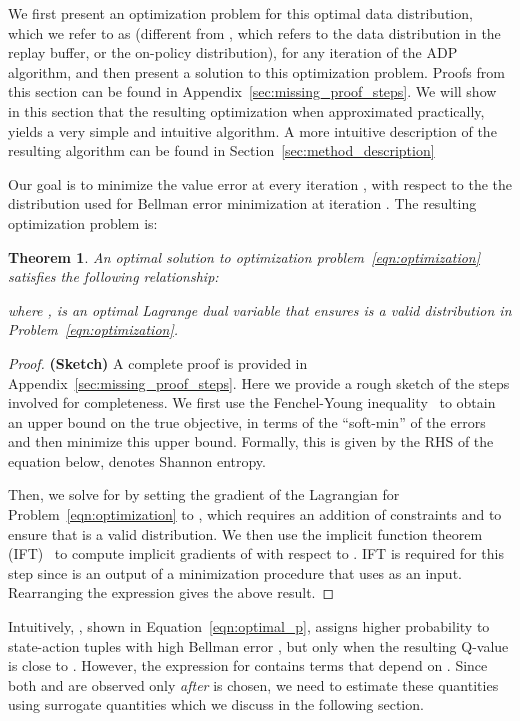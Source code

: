 \documentclass[jmlr]{article}
\newtheorem{theorem}{Theorem}[section]
\begin{document}
We first present an optimization problem for this optimal data distribution, which we refer to as  (different from , which refers to the data distribution in the replay buffer, or the on-policy distribution), for any iteration  of the ADP algorithm, and then present a solution to this optimization problem. 
Proofs from this section can be found in Appendix~\ref{sec:missing_proof_steps}. We will show in this section that the resulting optimization when approximated practically, yields a very simple and intuitive algorithm. A more intuitive description of the resulting algorithm can be found in Section~\ref{sec:method_description}




Our goal is to minimize the value error  at every iteration , with respect to the the distribution  used for Bellman error minimization at iteration . 
The resulting optimization problem is:

\begin{theorem}
\label{eqn:theorem_solution}
An optimal solution  to optimization problem~\ref{eqn:optimization} satisfies the following relationship:

where , is an optimal Lagrange dual variable that ensures  is a valid distribution in Problem~\ref{eqn:optimization}. 
\end{theorem}
\begin{proof}
\textbf{(Sketch)} A complete proof is provided in Appendix~\ref{sec:missing_proof_steps}. Here we provide a rough sketch of the steps involved for completeness. We first use the Fenchel-Young inequality~\cite{rockafellar-1970a} to obtain an upper bound on the true objective, in terms of the ``soft-min'' of the errors  and then minimize this upper bound. Formally, this is given by the RHS of the equation below,  denotes Shannon entropy.

Then, we solve for  by setting the gradient of the Lagrangian for Problem~\ref{eqn:optimization} to , which requires an addition of constraints  and  to ensure that  is a valid distribution. We then use the implicit function theorem (IFT)~\citep{Krantz2002TheIF} to compute implicit gradients of  with respect to . IFT is required for this step since  is an output of a minimization procedure that uses  as an input. Rearranging the expression gives the above result.    
\end{proof}

Intuitively, , shown in Equation~\ref{eqn:optimal_p}, assigns higher probability to state-action tuples with high Bellman error , but only when the resulting Q-value  is close to . However, the expression for  contains terms that depend on . Since both  and  are observed only \emph{after}  is chosen, we need to estimate these quantities using surrogate quantities which we discuss in the following section. 
\end{document}
